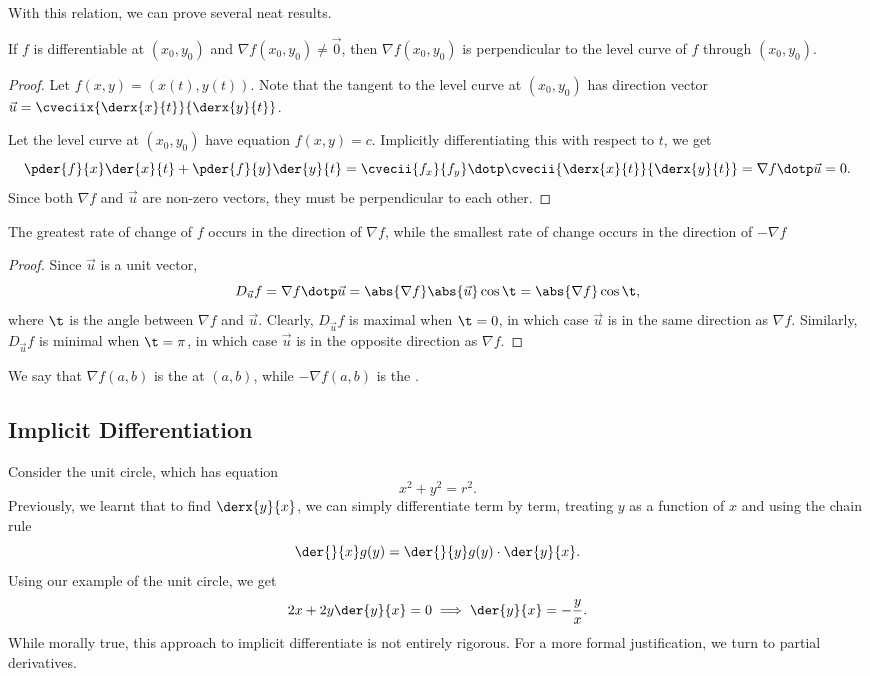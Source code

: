 With this relation, we can prove several neat results.

\begin{proposition}
    If $f$ is differentiable at $(x_0, y_0)$ and $\nabla f(x_0, y_0) \neq \vec 0$, then $\nabla f(x_0, y_0)$ is perpendicular to the level curve of $f$ through $(x_0, y_0)$.
\end{proposition}
\begin{proof}
    Let $f(x, y) = (x(t), y(t))$. Note that the tangent to the level curve at $(x_0, y_0)$ has direction vector $\vec u = \cveciix{\derx{x}{t}}{\derx{y}{t}}$.
    
    Let the level curve at $(x_0, y_0)$ have equation $f(x, y) = c$. Implicitly differentiating this with respect to $t$, we get \[\pder{f}{x} \der{x}{t} + \pder{f}{y} \der{y}{t} = \cvecii{f_x}{f_y} \dotp \cvecii{\derx{x}{t}}{\derx{y}{t}} = \nabla f \dotp \vec u = 0.\] Since both $\nabla f$ and $\vec u$ are non-zero vectors, they must be perpendicular to each other.
\end{proof}

\begin{proposition}
    The greatest rate of change of $f$ occurs in the direction of $\nabla f$, while the smallest rate of change occurs in the direction of $-\nabla f$
\end{proposition}
\begin{proof}
    Since $\vec u$ is a unit vector, \[D_{\vec u} f = \nabla f \dotp \vec u = \abs{\nabla f} \abs{\vec u} \cos \t = \abs{\nabla f} \cos \t,\] where $\t$ is the angle between $\nabla f$ and $\vec u$. Clearly, $D_{\vec u} f$ is maximal when $\t = 0$, in which case $\vec u$ is in the same direction as $\nabla f$. Similarly, $D_{\vec u} f$ is minimal when $\t = \pi$, in which case $\vec u$ is in the opposite direction as $\nabla f$.
\end{proof}

We say that $\nabla f(a,b)$ is the  at $(a, b)$, while $-\nabla f(a, b)$ is the .

\subsection{Implicit Differentiation}

Consider the unit circle, which has equation \[x^2 + y^2 = r^2.\] Previously, we learnt that to find $\derx{y}{x}$, we can simply differentiate term by term, treating $y$ as a function of $x$ and using the chain rule \[\der{}{x} g(y) = \der{}{y} g(y) \cdot \der{y}{x}.\] Using our example of the unit circle, we get \[2x + 2y \der{y}{x} = 0 \implies \der{y}{x} = -\frac{y}{x}.\] While morally true, this approach to implicit differentiate is not entirely rigorous. For a more formal justification, we turn to partial derivatives.

